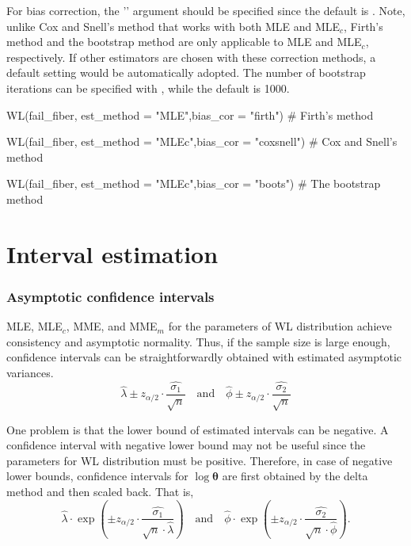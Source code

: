 For bias correction, the '' argument should be specified since the default is . Note, unlike Cox and Snell's method that works with both MLE and MLE$_c$, Firth's method and the bootstrap method are only applicable to MLE and MLE$_c$, respectively. If other estimators are chosen with these correction methods, a default setting would be automatically adopted. 
The number of bootstrap iterations can be specified with , while the default is 1000.
\begin{example}
	WL(fail_fiber, est_method = "MLE",bias_cor = "firth")   # Firth's method
\end{example}
\begin{example}
	WL(fail_fiber, est_method = "MLEc",bias_cor = "coxsnell") # Cox and Snell's method
\end{example}
\begin{example}
	WL(fail_fiber, est_method = "MLEc",bias_cor = "boots") # The bootstrap method
\end{example}





\section{Interval estimation}



\subsubsection{Asymptotic confidence intervals}
MLE, MLE$_{c}$, MME, and MME$_{m}$ for the parameters of WL distribution achieve consistency and asymptotic normality. Thus, if the sample size is large enough, confidence intervals can be straightforwardly obtained with estimated asymptotic variances.
$$ \widehat{\lambda}\pm z_{\alpha/2}\cdot \frac{\widehat{\sigma_{1}}}{\sqrt{n}}\quad\text{and}\quad\widehat{\phi}\pm z_{\alpha/2}\cdot \frac{\widehat{\sigma_{2}}}{\sqrt{n}} $$

One problem is that the lower bound of estimated intervals can be negative. A confidence interval with negative lower bound may not be useful since the parameters for WL distribution must be positive. Therefore, in case of negative lower bounds, confidence intervals for $\operatorname{log}\boldsymbol{\theta}$ are first obtained by the delta method and then scaled back. That is,
$$\widehat{\lambda}\cdot\operatorname{exp}\left(\pm z_{\alpha/2}\cdot\frac{\widehat{\sigma_{1}}}{\sqrt{n}\cdot\widehat{\lambda}}\right)\quad\text{and} \quad \widehat{\phi}\cdot\operatorname{exp}\left(\pm z_{\alpha/2}\cdot\frac{\widehat{\sigma_{2}}}{\sqrt{n}\cdot\widehat{\phi}}\right).$$




